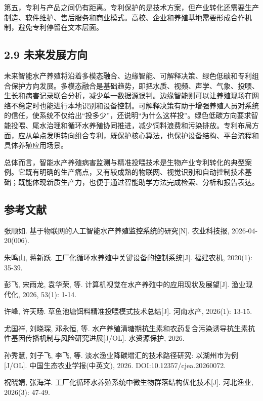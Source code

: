 \documentclass[UTF8,zihao=-4]{ctexart}
\begin{document}
	第五，专利与产品之间仍有距离。专利保护的是技术方案，但产业转化还需要生产制造、软件维护、售后服务和商业模式。高校、企业和养殖基地需要形成合作机制，避免专利停留在文本层面。
	
	\subsection*{2.9 未来发展方向}
	
	未来智能水产养殖将沿着多模态融合、边缘智能、可解释决策、绿色低碳和专利组合保护方向发展。多模态融合是基础趋势，即把水质、视频、声学、气象、投喂、生长和病害记录联合分析，减少单一数据源误判。边缘智能则可以让养殖现场在网络不稳定时也能进行本地识别和设备控制。可解释决策有助于增强养殖人员对系统的信任，使系统不仅给出“投多少”，还说明“为什么这样投”。绿色低碳方向要求智能投喂、尾水治理和循环水养殖协同推进，减少饲料浪费和污染排放。专利布局方面，应从单点发明转向组合专利，既保护核心算法，也保护设备结构、平台流程和具体养殖应用场景。
	
	总体而言，智能水产养殖病害监测与精准投喂技术是生物产业专利转化的典型案例。它既有明确的生产痛点，又有较成熟的物联网、视觉识别和自动控制技术基础；既能体现新质生产力，也便于通过智能助学方法完成检索、分析和报告表达。
	
	\subsection*{参考文献}
	
	\begin{enumerate}[label={[\arabic*]}]
		\item 张顺如. 基于物联网的人工智能水产养殖监控系统的研究[N]. 农业科技报, 2026-04-20(006).
		\item 朱鸣山, 蒋新跃. 工厂化循环水养殖中关键设备的控制系统[J]. 福建农机, 2020(1): 35-39.
		\item 彭飞, 宋雨龙, 袁华荣, 等. 计算机视觉在水产养殖中的应用现状及展望[J]. 渔业现代化, 2026, 53(1): 1-14.
		\item 许峰, 许天旸. 草鱼池塘饵料精准投喂模式技术总结[J]. 河南水产, 2026(1): 13-15.
		\item 尤国祥, 刘晓琛, 邓永恒, 等. 水产养殖清塘期抗生素和农药复合污染诱导抗生素抗性基因传播机制与风险研究进展[J/OL]. 水资源保护, 2026.
		\item 孙秀慧, 刘子飞, 李飞, 等. 淡水渔业降碳增汇的技术路径研究: 以湖州市为例[J/OL]. 中国生态农业学报(中英文), 2026. DOI:10.12357/cjea.20260072.
		\item 祝晓婧, 张海洋. 工厂化循环水养殖系统中微生物群落结构优化技术[J]. 河北渔业, 2026(3): 47-49.
	\end{enumerate}
	
\end{document}
